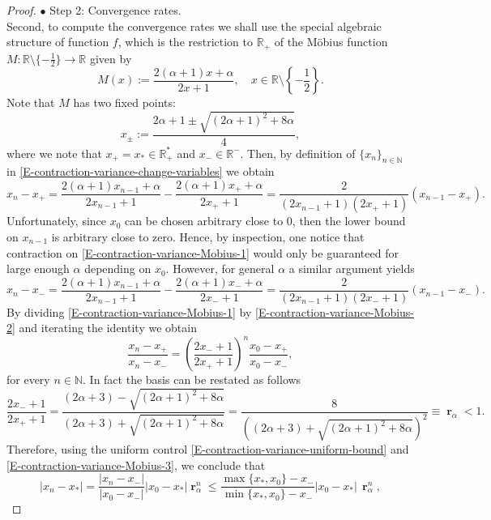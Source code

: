 \documentclass[reqno]{amsart}
\DeclareMathOperator{\br}{\boldsymbol{r}}
\numberwithin{equation}{section}
\begin{document}
{\begin{proof}
$\bullet$ {\sc Step 2:} Convergence rates.\\
Second, to compute the convergence rates we shall use the special algebraic structure of function $f$, which is the restriction to $\mathbb{R}_+$ of the M\"{o}bius function $M:\mathbb{R}\setminus\{-\frac{1}{2}\}\longrightarrow \mathbb{R}$ given by
$$M(x):=\frac{2(\alpha+1)x+\alpha}{2x+1},\quad x\in \mathbb{R}\setminus\left\{-\frac{1}{2}\right\}.$$
Note that $M$ has two fixed points:
$$
x_{\pm}:=\frac{2\alpha+1\pm\sqrt{(2\alpha+1)^2+8\alpha}}{4},
$$
where we note that $x_+=x_*\in \mathbb{R}_+^*$ and $x_-\in \mathbb{R}^-$. Then, by definition of $\{x_n\}_{n\in \mathbb{N}}$ in \eqref{E-contraction-variance-change-variables} we obtain
\begin{equation}\label{E-contraction-variance-Mobius-1}
x_n-x_+=\frac{2(\alpha+1)x_{n-1}+\alpha}{2x_{n-1}+1}-\frac{2(\alpha+1)x_++\alpha}{2x_++1}=\frac{2}{(2x_{n-1}+1)(2 x_++1)}(x_{n-1}-x_+).
\end{equation}
Unfortunately, since $x_0$ can be chosen arbitrary close to $0$, then the lower bound on $x_{n-1}$ is arbitrary close to zero. Hence, by inspection, one notice that contraction on \eqref{E-contraction-variance-Mobius-1} would only be guaranteed for large enough $\alpha$ depending on $x_0$. However, for general $\alpha$ a similar argument yields
\begin{equation}\label{E-contraction-variance-Mobius-2}
x_n-x_-=\frac{2(\alpha+1)x_{n-1}+\alpha}{2x_{n-1}+1}-\frac{2(\alpha+1)x_-+\alpha}{2x_-+1}=\frac{2}{(2x_{n-1}+1)(2 x_-+1)}(x_{n-1}-x_-).
\end{equation}
By dividing \eqref{E-contraction-variance-Mobius-1} by \eqref{E-contraction-variance-Mobius-2} and iterating the identity we obtain
\begin{equation}\label{E-contraction-variance-Mobius-3}
\frac{x_n-x_+}{x_n-x_-}=\left(\frac{2x_-+1}{2x_++1}\right)^n\frac{x_0-x_+}{x_0-x_-},
\end{equation}
for every $n\in \mathbb{N}$. In fact the basis can be restated as follows
$$\frac{2x_-+1}{2x_++1}=\frac{(2\alpha+3)-\sqrt{(2\alpha+1)^2+8\alpha}}{(2\alpha+3)+\sqrt{(2\alpha+1)^2+8\alpha}}=\frac{8}{\left((2\alpha+3)+\sqrt{(2\alpha+1)^2+8\alpha}\right)^2}\equiv \br_\alpha<1.$$
Therefore, using the uniform control \eqref{E-contraction-variance-uniform-bound} and \eqref{E-contraction-variance-Mobius-3}, we conclude that
\begin{equation}\label{E-contraction-variance-1}
\vert x_n-x_*\vert=\frac{\vert x_n-x_-\vert}{\vert x_0-x_-\vert}\vert x_0-x_*\vert\br_\alpha^n\leq  \frac{\max\{x_*,x_0\}-x_-}{\min\{x_*,x_0\}-x_-}\vert x_0-x_*\vert\,\br_\alpha^n,

\end{equation}
\end{proof}}
\end{document}
